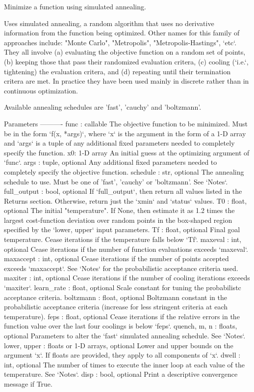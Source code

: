 \begin{DoxyVerb}Minimize a function using simulated annealing.

Uses simulated annealing, a random algorithm that uses no derivative
information from the function being optimized. Other names for this
family of approaches include: "Monte Carlo", "Metropolis",
"Metropolis-Hastings", `etc`. They all involve (a) evaluating the
objective function on a random set of points, (b) keeping those that
pass their randomized evaluation critera, (c) cooling (`i.e.`,
tightening) the evaluation critera, and (d) repeating until their
termination critera are met.  In practice they have been used mainly in
discrete rather than in continuous optimization.

Available annealing schedules are 'fast', 'cauchy' and 'boltzmann'.

Parameters
----------
func : callable
    The objective function to be minimized.  Must be in the form
    `f(x, *args)`, where `x` is the argument in the form of a 1-D array
    and `args` is a  tuple of any additional fixed parameters needed to
    completely specify the function.
x0: 1-D array
    An initial guess at the optimizing argument of `func`.
args : tuple, optional
    Any additional fixed parameters needed to completely
    specify the objective function.
schedule : str, optional
    The annealing schedule to use.  Must be one of 'fast', 'cauchy' or
    'boltzmann'.  See `Notes`.
full_output : bool, optional
    If `full_output`, then return all values listed in the Returns
    section. Otherwise, return just the `xmin` and `status` values.
T0 : float, optional
    The initial "temperature".  If None, then estimate it as 1.2 times
    the largest cost-function deviation over random points in the
    box-shaped region specified by the `lower, upper` input parameters.
Tf : float, optional
    Final goal temperature.  Cease iterations if the temperature
    falls below `Tf`.
maxeval : int, optional
    Cease iterations if the number of function evaluations exceeds
    `maxeval`.
maxaccept : int, optional
    Cease iterations if the number of points accepted exceeds `maxaccept`.
    See `Notes` for the probabilistic acceptance criteria used.
maxiter : int, optional
    Cease iterations if the number of cooling iterations exceeds `maxiter`.
learn_rate : float, optional
    Scale constant for tuning the probabilistc acceptance criteria.
boltzmann : float, optional
    Boltzmann constant in the probabilistic acceptance criteria
    (increase for less stringent criteria at each temperature).
feps : float, optional
    Cease iterations if the relative errors in the function value over the
    last four coolings is below `feps`.
quench, m, n : floats, optional
    Parameters to alter the `fast` simulated annealing schedule.
    See `Notes`.
lower, upper : floats or 1-D arrays, optional
    Lower and upper bounds on the argument `x`.  If floats are provided,
    they apply to all components of `x`.
dwell : int, optional
    The number of times to execute the inner loop at each value of the
    temperature.  See `Notes`.
disp : bool, optional
    Print a descriptive convergence message if True.


\end{DoxyVerb}
